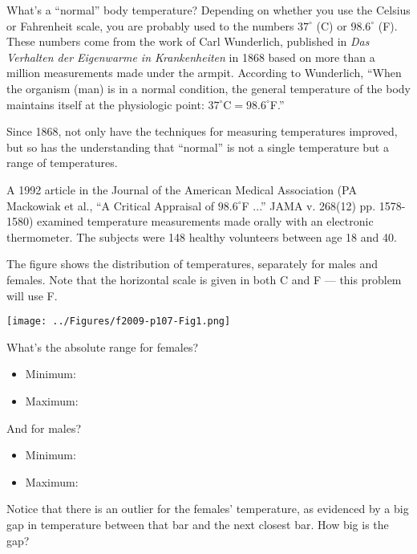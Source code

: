 
What's a ``normal'' body temperature?  Depending on whether you
use the Celsius or Fahrenheit scale, you are probably used to the
numbers $37^\circ$ (C) or $98.6^\circ$ (F).  These numbers come from
the work of Carl Wunderlich, published in {\em Das Verhalten der Eigenwarme
in Krankenheiten} in 1868 based on more than a million measurements
made under the armpit.  According to Wunderlich, ``When the organism (man) is in a normal condition,
the general temperature of the body maintains itself at the
physiologic point: $37^\circ$C$=98.6^\circ$F.''

Since 1868, not only have the techniques for measuring temperatures
improved, but so has the understanding that ``normal'' is not a single
temperature but a range of temperatures.

A 1992 article in the Journal of the American Medical Association (PA
Mackowiak et al., ``A Critical Appraisal of $98.6^\circ$F ...''  JAMA
v. 268(12) pp. 1578-1580) examined temperature measurements made
orally with an electronic thermometer.  The subjects were 148 healthy
volunteers between age 18 and 40.

The figure shows the distribution of temperatures, separately for
males and females.  Note that the horizontal scale is given in both C
and F --- this problem will use F.

\bigskip
\centerline{\texttt{[image: ../Figures/f2009-p107-Fig1.png]}}
\bigskip

What's the absolute range for females?
\begin{itemize}
\item Minimum: 
\item Maximum: 
\end{itemize}

\bigskip
\noindent And for males?
\begin{itemize}
\item Minimum:  
\item Maximum: 
\end{itemize}

Notice that there is an outlier for the females' temperature, as
evidenced by a big gap in temperature between that bar and the next closest bar.  How
big is the gap?
\begin{MultipleChoice}
\end{MultipleChoice}

